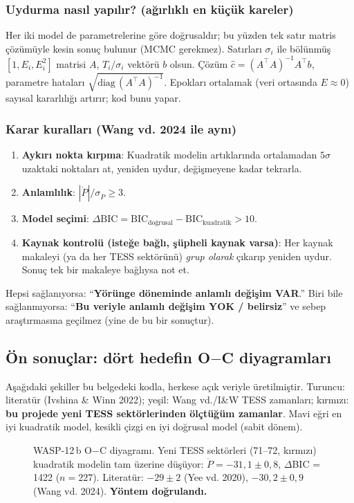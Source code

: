 \subsubsection*{Uydurma nasıl yapılır? (ağırlıklı en küçük kareler)}
Her iki model de parametrelerine göre doğrusaldır; bu yüzden tek satır matris çözümüyle kesin sonuç bulunur
(MCMC gerekmez). Satırları $\sigma_i$ ile bölünmüş $[1, E_i, E_i^2]$ matrisi $A$, $T_i/\sigma_i$ vektörü $b$ olsun.
Çözüm $\hat c = (A^\top A)^{-1}A^\top b$, parametre hataları $\sqrt{\mathrm{diag}\,(A^\top A)^{-1}}$.
Epokları ortalamak (veri ortasında $E \approx 0$) sayısal kararlılığı artırır; kod bunu yapar.

\subsubsection*{Karar kuralları (Wang vd. 2024 ile aynı)}
\begin{enumerate}[leftmargin=*]
\item \textbf{Aykırı nokta kırpma}: Kuadratik modelin artıklarında ortalamadan $5\sigma$ uzaktaki noktaları at,
      yeniden uydur, değişmeyene kadar tekrarla.
\item \textbf{Anlamlılık}: $|\dot P|/\sigma_{\dot P} \ge 3$.
\item \textbf{Model seçimi}: $\Delta\mathrm{BIC} = \mathrm{BIC}_\text{doğrusal} - \mathrm{BIC}_\text{kuadratik} > 10$.
\item \textbf{Kaynak kontrolü (isteğe bağlı, şüpheli kaynak varsa)}: Her kaynak makaleyi (ya da her TESS
      sektörünü) \emph{grup olarak} çıkarıp yeniden uydur. Sonuç tek bir makaleye bağlıysa not et.
\end{enumerate}
Hepsi sağlanıyorsa: “\textbf{Yörünge döneminde anlamlı değişim VAR}.” Biri bile sağlanmıyorsa:
“\textbf{Bu veriyle anlamlı değişim YOK / belirsiz}” ve sebep araştırmasına geçilmez (yine de bu bir sonuçtur).

\subsection{Ön sonuçlar: dört hedefin O$-$C diyagramları}
Aşağıdaki şekiller bu belgedeki kodla, herkese açık veriyle üretilmiştir. Turuncu: literatür (Ivshina \& Winn 2022);
yeşil: Wang vd./I\&W TESS zamanları; kırmızı: \textbf{bu projede yeni TESS sektörlerinden ölçtüğüm zamanlar}.
Mavi eğri en iyi kuadratik model, kesikli çizgi en iyi doğrusal model (sabit dönem).

\begin{figure}[H]
\centering
{}
\caption{WASP-12\,b O$-$C diyagramı. Yeni TESS sektörleri (71–72, kırmızı) kuadratik modelin tam üzerine düşüyor:
$\dot P = -31{,}1 \pm 0{,}8$\msyil, $\Delta$BIC = 1422 ($n = 227$). Literatür: $-29\pm2$ (Yee vd. 2020),
$-30{,}2\pm0{,}9$ (Wang vd. 2024). \textbf{Yöntem doğrulandı.}}
\label{fig:w12}
\end{figure}


